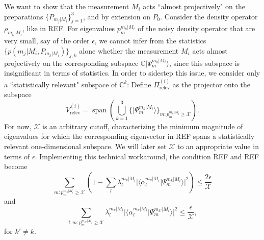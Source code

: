 We want to show that the measurement $M_i$ acts ``almost projectively" on the preparations $\{P_{m_j\vert M_i}\}_{j=1}^3$, and by extension on $P_0$. Consider the density operator $\rho_{m_k\vert M_i}$, like in REF. For eigenvalues $p_m^{m_k\vert M_i}$ of the noisy density operator that are very small, say of the order $\epsilon$, we cannot infer from the statistics $\{p(m_j\vert M_i, P_{m_k\vert M_i})\}_{j,k}$ alone whether the measurement $M_i$ acts almost projectively on the corresponding subspace $\mathbb{C}\vert \Psi_m^{m_k\vert M_i}\rangle$, since this subspace is insignificant in terms of statistics. In order to sidestep this issue, we consider only a ``statistically relevant" subspace of $\mathbb{C}^k$:
Define $\Pi_{\text{relev}}^{(i)}$ as the projector onto the subspace 
\begin{equation}
V_{\text{relev}}^{(i)}=\operatorname{span}(\bigcup_{k=1}^3\{\vert \Psi_m^{m_k\vert M_i}\rangle\}_{m:p_m^{m_k\vert M_i}\geq\mathcal{X}}).
\end{equation}
For now, $\mathcal{X}$ is an arbitrary cutoff, characterizing the minimum magnitude of eigenvalues for which the corresponding eigenvector in REF spans a statistically relevant one-dimensional subspace. We will later set $\mathcal{X}$ to an appropriate value in terms of $\epsilon$. Implementing this technical workaround, the condition REF and REF become
\begin{equation}
\sum_{m:p_m^{m_k\vert M_i}\geq \mathcal{X}} (1-\sum_l \lambda_l^{m_k\vert M_i} \vert \langle \alpha_l^{m_k\vert M_i}\vert \Psi_m^{m_k\vert M_i} \rangle \vert^2)\leq \frac{2\epsilon}{\mathcal{X}}
\end{equation}
and
\begin{equation}
\sum_{l,m:p_m^{m_{k'}\vert M_i}\geq \mathcal{X}} \lambda_l^{m_k\vert M_i} \vert \langle \alpha_l^{m_k\vert M_i}\vert \Psi_m^{m_{k'}\vert M_i} \rangle \vert^2\leq \frac{\epsilon}{\mathcal{X}},
\end{equation}
for $k'\neq k$.

